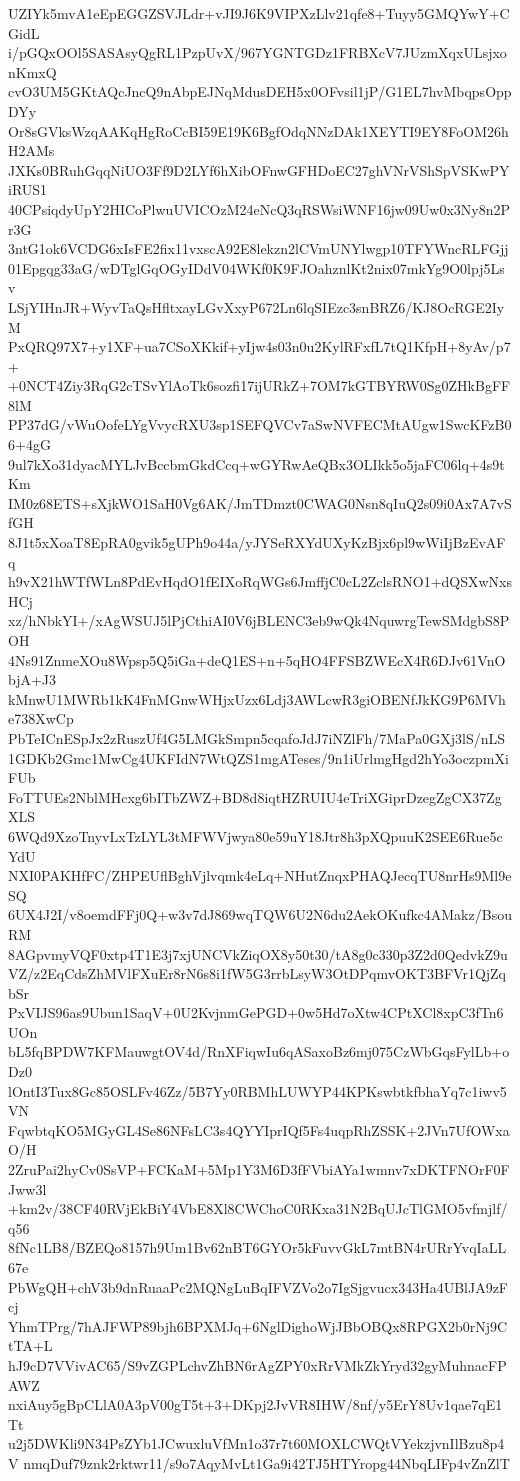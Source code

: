 UZIYk5mvA1eEpEGGZSVJLdr+vJI9J6K9VIPXzLlv21qfe8+Tuyy5GMQYwY+CGidL
i/pGQxOOl5SASAsyQgRL1PzpUvX/967YGNTGDz1FRBXcV7JUzmXqxULsjxonKmxQ
cvO3UM5GKtAQcJncQ9nAbpEJNqMdusDEH5x0OFvsil1jP/G1EL7hvMbqpsOppDYy
Or8sGVksWzqAAKqHgRoCcBI59E19K6BgfOdqNNzDAk1XEYTI9EY8FoOM26hH2AMs
JXKs0BRuhGqqNiUO3Ff9D2LYf6hXibOFnwGFHDoEC27ghVNrVShSpVSKwPYiRUS1
40CPsiqdyUpY2HICoPlwuUVICOzM24eNcQ3qRSWsiWNF16jw09Uw0x3Ny8n2Pr3G
3ntG1ok6VCDG6xIsFE2fix11vxscA92E8lekzn2lCVmUNYlwgp10TFYWncRLFGjj
01Epgqg33aG/wDTglGqOGyIDdV04WKf0K9FJOahznlKt2nix07mkYg9O0lpj5Lsv
LSjYIHnJR+WyvTaQsHfltxayLGvXxyP672Ln6lqSIEzc3snBRZ6/KJ8OcRGE2IyM
PxQRQ97X7+y1XF+ua7CSoXKkif+yIjw4s03n0u2KylRFxfL7tQ1KfpH+8yAv/p7+
+0NCT4Ziy3RqG2cTSvYlAoTk6sozfi17ijURkZ+7OM7kGTBYRW0Sg0ZHkBgFF8lM
PP37dG/vWuOofeLYgVvycRXU3sp1SEFQVCv7aSwNVFECMtAUgw1SwcKFzB06+4gG
9ul7kXo31dyacMYLJvBccbmGkdCcq+wGYRwAeQBx3OLIkk5o5jaFC06lq+4s9tKm
IM0z68ETS+sXjkWO1SaH0Vg6AK/JmTDmzt0CWAG0Nsn8qIuQ2s09i0Ax7A7vSfGH
8J1t5xXoaT8EpRA0gvik5gUPh9o44a/yJYSeRXYdUXyKzBjx6pl9wWiIjBzEvAFq
h9vX21hWTfWLn8PdEvHqdO1fEIXoRqWGs6JmffjC0cL2ZclsRNO1+dQSXwNxsHCj
xz/hNbkYI+/xAgWSUJ5lPjCthiAI0V6jBLENC3eb9wQk4NquwrgTewSMdgbS8POH
4Ns91ZnmeXOu8Wpsp5Q5iGa+deQ1ES+n+5qHO4FFSBZWEcX4R6DJv61VnObjA+J3
kMnwU1MWRb1kK4FnMGnwWHjxUzx6Ldj3AWLcwR3giOBENfJkKG9P6MVhe738XwCp
PbTeICnESpJx2zRuszUf4G5LMGkSmpn5cqafoJdJ7iNZlFh/7MaPa0GXj3lS/nLS
1GDKb2Gmc1MwCg4UKFIdN7WtQZS1mgATeses/9n1iUrlmgHgd2hYo3oczpmXiFUb
FoTTUEs2NblMHcxg6bITbZWZ+BD8d8iqtHZRUIU4eTriXGiprDzegZgCX37ZgXLS
6WQd9XzoTnyvLxTzLYL3tMFWVjwya80e59uY18Jtr8h3pXQpuuK2SEE6Rue5cYdU
NXI0PAKHfFC/ZHPEUflBghVjlvqmk4eLq+NHutZnqxPHAQJecqTU8nrHs9Ml9eSQ
6UX4J2I/v8oemdFFj0Q+w3v7dJ869wqTQW6U2N6du2AekOKufkc4AMakz/BsouRM
8AGpvmyVQF0xtp4T1E3j7xjUNCVkZiqOX8y50t30/tA8g0c330p3Z2d0QedvkZ9u
VZ/z2EqCdsZhMVlFXuEr8rN6s8i1fW5G3rrbLsyW3OtDPqmvOKT3BFVr1QjZqbSr
PxVIJS96as9Ubun1SaqV+0U2KvjnmGePGD+0w5Hd7oXtw4CPtXCl8xpC3fTn6UOn
bL5fqBPDW7KFMauwgtOV4d/RnXFiqwIu6qASaxoBz6mj075CzWbGqsFylLb+oDz0
lOntI3Tux8Gc85OSLFv46Zz/5B7Yy0RBMhLUWYP44KPKswbtkfbhaYq7c1iwv5VN
FqwbtqKO5MGyGL4Se86NFsLC3s4QYYIprIQf5Fs4uqpRhZSSK+2JVn7UfOWxaO/H
2ZruPai2hyCv0SsVP+FCKaM+5Mp1Y3M6D3fFVbiAYa1wmnv7xDKTFNOrF0FJww3l
+km2v/38CF40RVjEkBiY4VbE8Xl8CWChoC0RKxa31N2BqUJcTlGMO5vfmjlf/q56
8fNc1LB8/BZEQo8157h9Um1Bv62nBT6GYOr5kFuvvGkL7mtBN4rURrYvqIaLL67e
PbWgQH+chV3b9dnRuaaPc2MQNgLuBqIFVZVo2o7IgSjgvucx343Ha4UBlJA9zFcj
YhmTPrg/7hAJFWP89bjh6BPXMJq+6NglDighoWjJBbOBQx8RPGX2b0rNj9CtTA+L
hJ9cD7VVivAC65/S9vZGPLchvZhBN6rAgZPY0xRrVMkZkYryd32gyMuhnacFPAWZ
nxiAuy5gBpCLlA0A3pV00gT5t+3+DKpj2JvVR8IHW/8nf/y5ErY8Uv1qae7qE1Tt
u2j5DWKli9N34PsZYb1JCwuxluVfMn1o37r7t60MOXLCWQtVYekzjvnIlBzu8p4V
nmqDuf79znk2rktwr11/s9o7AqyMvLt1Ga9i42TJ5HTYropg44NbqLIFp4vZnZlT
